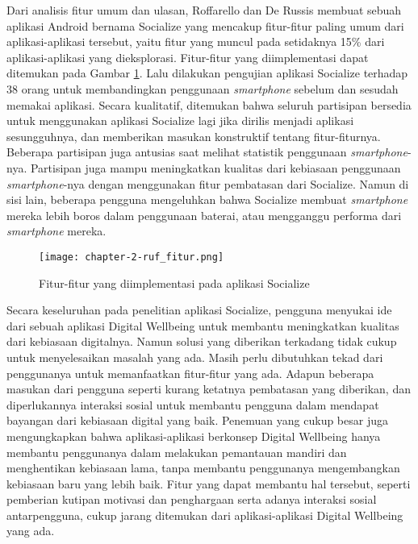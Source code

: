 Dari analisis fitur umum dan ulasan, Roffarello dan De Russis membuat sebuah aplikasi Android bernama Socialize yang mencakup fitur-fitur paling umum dari aplikasi-aplikasi tersebut, yaitu fitur yang muncul pada setidaknya 15\% dari aplikasi-aplikasi yang dieksplorasi. Fitur-fitur yang diimplementasi dapat ditemukan pada Gambar \ref{img:ruf_fitur}. Lalu dilakukan pengujian aplikasi Socialize terhadap 38 orang untuk membandingkan penggunaan \textit{smartphone} sebelum dan sesudah memakai aplikasi. Secara kualitatif, ditemukan bahwa seluruh partisipan bersedia untuk menggunakan aplikasi Socialize lagi jika dirilis menjadi aplikasi sesungguhnya, dan memberikan masukan konstruktif tentang fitur-fiturnya. Beberapa partisipan juga antusias saat melihat statistik penggunaan \textit{smartphone}-nya. Partisipan juga mampu meningkatkan kualitas dari kebiasaan penggunaan \textit{smartphone}-nya dengan menggunakan fitur pembatasan dari Socialize. Namun di sisi lain, beberapa pengguna mengeluhkan bahwa Socialize membuat \textit{smartphone} mereka lebih boros dalam penggunaan baterai, atau mengganggu performa dari \textit{smartphone} mereka.

\begin{figure}[h]
  \centering
  \texttt{[image: chapter-2-ruf\_fitur.png]}
  \caption{Fitur-fitur yang diimplementasi pada aplikasi Socialize \parencite{CHI2019SOCIALIZE}}
  \label{img:ruf_fitur}
\end{figure}

Secara keseluruhan pada penelitian aplikasi Socialize, pengguna menyukai ide dari sebuah aplikasi Digital Wellbeing untuk membantu meningkatkan kualitas dari kebiasaan digitalnya. Namun solusi yang diberikan terkadang tidak cukup untuk menyelesaikan masalah yang ada. Masih perlu dibutuhkan tekad dari penggunanya untuk memanfaatkan fitur-fitur yang ada. Adapun beberapa masukan dari pengguna seperti kurang ketatnya pembatasan yang diberikan, dan diperlukannya interaksi sosial untuk membantu pengguna dalam mendapat bayangan dari kebiasaan digital yang baik. Penemuan yang cukup besar juga mengungkapkan bahwa aplikasi-aplikasi berkonsep Digital Wellbeing hanya membantu penggunanya dalam melakukan pemantauan mandiri dan menghentikan kebiasaan lama, tanpa membantu penggunanya mengembangkan kebiasaan baru yang lebih baik. Fitur yang dapat membantu hal tersebut, seperti pemberian kutipan motivasi dan penghargaan serta adanya interaksi sosial antarpengguna, cukup jarang ditemukan dari aplikasi-aplikasi Digital Wellbeing yang ada.

